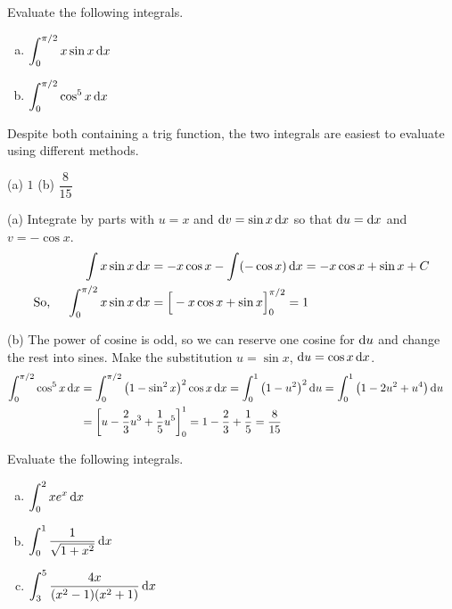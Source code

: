 \begin{question}[1997D]
Evaluate the following integrals.
\begin{enumerate}[(a)]
\item
$\displaystyle\int_0^{\pi/2} x\sin x\,\mathrm{d}x $
\item
$\displaystyle\int_0^{\pi/2} \cos^5 x\,\mathrm{d}x $
\end{enumerate}
\end{question}

\begin{hint}
Despite both containing a trig function, the two integrals are easiest to evaluate using  different methods.
\end{hint}

\begin{answer} (a)
$1$
\qquad (b)
 $\dfrac{8}{15}$
\end{answer}

\begin{solution} (a)
Integrate by parts with $u=x$ and $\mathrm{d}v=\sin x\,\mathrm{d}x$ so that
$\mathrm{d}u=\mathrm{d}x$ and $v=-\cos x$.
\begin{align*}
\int x\sin x\,\mathrm{d}x&= -x\cos x-\int (-\cos x)\,\mathrm{d}x
=-x\cos x+\sin x+C\\
\mbox{So, }\quad\int_0^{\pi/2} x\sin x\,\mathrm{d}x&=\Big[-x\cos x+\sin x\Big]_0^{\pi/2}
=1
\end{align*}

\noindent (b)
The power of cosine is odd, so we can reserve one cosine for $\mathrm{d}u$ and change the rest into sines. Make the substitution $u=\sin x$, $\mathrm{d}u=\cos x\,\mathrm{d}x$.
\begin{align*}
\int_0^{\pi/2} \cos^5 x\,\mathrm{d}x
&=\int_0^{\pi/2} \big(1-\sin^2x\big)^2\cos x\,\mathrm{d}x
=\int_0^1\big(1-u^2\big)^2\,\mathrm{d}u
=\int_0^1\big(1-2u^2+u^4\big)\,\mathrm{d}u\cr
&=\left[u-\frac{2}{3}u^3+\frac{1}{5}u^5\right]_0^1
=1-\frac{2}{3}+\frac{1}{5}
=\frac{8}{15}
\end{align*}


\end{solution}



\begin{question}[1998A]
Evaluate the following integrals.
\begin{enumerate}[(a)]
\item
$\displaystyle\int_0^2 xe^x\,\mathrm{d}x$
\item
 $\displaystyle\int_0^1\frac{1}{\sqrt{1+x^2}}\,\mathrm{d}x$
\item
$\displaystyle\int_3^5\frac{4x}{(x^2-1)(x^2+1)}\,\mathrm{d}x$
\end{enumerate}
\end{question}

